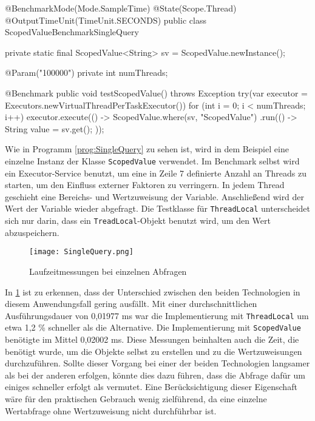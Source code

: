     \begin{program} [H]
        \caption{Laufzeit bei einzelnen Abfragen}
        \label{prog:SingleQuery}
    \begin{JavaCode}[language=Java, numbers=left]
@BenchmarkMode(Mode.SampleTime)
@State(Scope.Thread)
@OutputTimeUnit(TimeUnit.SECONDS)
public class ScopedValueBenchmarkSingleQuery {
    private static final ScopedValue<String> sv = ScopedValue.newInstance();

    @Param({"100000"})
    private int numThreads;

    @Benchmark
    public void testScopedValue() throws Exception {
        try(var executor = Executors.newVirtualThreadPerTaskExecutor()) {
            for (int i = 0; i < numThreads; i++) {
                executor.execute(() -> ScopedValue.where(sv, "ScopedValue")
                .run(() -> { String value = sv.get(); }));
            }
        }
    }
}\end{JavaCode}
    \end{program}

    Wie in Programm \ref{prog:SingleQuery} zu sehen ist, wird in dem Beispiel eine einzelne Instanz der Klasse \texttt{ScopedValue} verwendet. Im Benchmark selbst wird ein Executor-Service benutzt, um eine
    in Zeile 7 definierte Anzahl an Threads zu starten, um den Einfluss externer Faktoren zu verringern. In jedem Thread geschieht eine Bereichs- und Wertzuweisung der Variable.
    Anschließend wird der Wert der Variable wieder abgefragt. Die Testklasse für \texttt{ThreadLocal} unterscheidet sich nur darin, dass ein \texttt{TreadLocal}-Objekt benutzt wird, um den Wert
    abzuspeichern.

    \begin{figure}[H]
        \centering
        \texttt{[image: SingleQuery.png]}
        \caption{Laufzeitmessungen bei einzelnen Abfragen}
        \label{fig:SingleQuery}
    \end{figure}

    In \ref{fig:SingleQuery} ist zu erkennen, dass der Unterschied zwischen den beiden Technologien in diesem Anwendungsfall gering ausfällt. Mit einer durchschnittlichen Ausführungsdauer von
    0,01977 ms war die Implementierung mit \texttt{ThreadLocal} um etwa 1,2 \% schneller als die Alternative. Die Implementierung mit \texttt{ScopedValue} benötigte im Mittel 0,02002 ms.
    Diese Messungen beinhalten auch die Zeit, die benötigt wurde, um die Objekte selbst zu erstellen und zu die Wertzuweisungen durchzuführen. Sollte dieser Vorgang bei einer der beiden Technologien 
    langsamer als bei der anderen erfolgen, könnte dies dazu führen, dass die Abfrage dafür um einiges schneller erfolgt als vermutet. Eine Berücksichtigung dieser Eigenschaft wäre für den praktischen
    Gebrauch wenig zielführend, da eine einzelne Wertabfrage ohne Wertzuweisung nicht durchführbar ist. 

